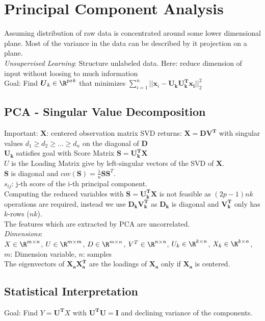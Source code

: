 \documentclass[english]{latex4ei/latex4ei_sheet}
\begin{document}
\section{Principal Component Analysis}
\begin{sectionbox}
Assuming distribution of raw data is concentrated around some lower dimensional plane. Most of the variance in the data can be described by it projection on a plane.\\
\emph{Unsupervised Learning}: Structure unlabeled data. Here: reduce dimension of input without loosing to much information\\
Goal: Find $\boldsymbol{U}_k\in\R^{pxk}$ that minimizes $\sum\limits_{i=1}^n||\boldsymbol{x}_i-\boldsymbol{U_kU_k^Tx_i}||^2_2$
\subsection{PCA - Singular Value Decomposition}
Important: $\boldsymbol{X}$: centered observation matrix
SVD returns: $\boldsymbol{X} = \boldsymbol{DV^T}$ with singular values $d_1\ge d_2\ge ... \ge d_n$ on the diagonal of \textbf{D}\\
$\boldsymbol{U_k}$ satisfies goal with Score Matrix $\boldsymbol{S}=\boldsymbol{U_k^TX}$\\
$U$ is the Loading Matrix give by left-singular vectors of the SVD of $\boldsymbol{\hat{X}}$.\\ 
$\boldsymbol{S}$ is diagonal and $cov(\boldsymbol{S})=\frac{1}{n}\boldsymbol{S}\boldsymbol{S}^T$.\\
$s_{ij}$: j-th score of the i-th principal component.\\
Computing the reduced variables with $\boldsymbol{S}=\boldsymbol{U_k^T}\boldsymbol{X}$ is not feasible as $(2p-1)nk$ operations are required, instead we use $\boldsymbol{D_kV_k^T}$ as $\boldsymbol{D_k}$ is diagonal and $\boldsymbol{V_k^T}$ only has $k$-rows ($nk$).\\
The features which are extracted by PCA are uncorrelated.\\
\emph{Dimensions}:\\ $X\in\R^{m\times n}$, $U\in\R^{m\times m}$, $D\in\R^{m\times n}$, $V^T\in\R^{n\times n}$, $U_k\in\R^{k\times n}$, $X_k\in\R^{k\times n}$, $m$: Dimension variable, $n$: samples\\
The eigenvectors of $\mathbf{X_aX_a^T}$ are the loadings of $\mathbf{X_a}$ only if $\mathbf{X_a}$ is centered.

\subsection{Statistical Interpretation}
Goal: Find $Y=\boldsymbol{U^T}X$ with $\boldsymbol{U^TU=I}$ and declining variance of the components.


\end{sectionbox}
\end{document}
